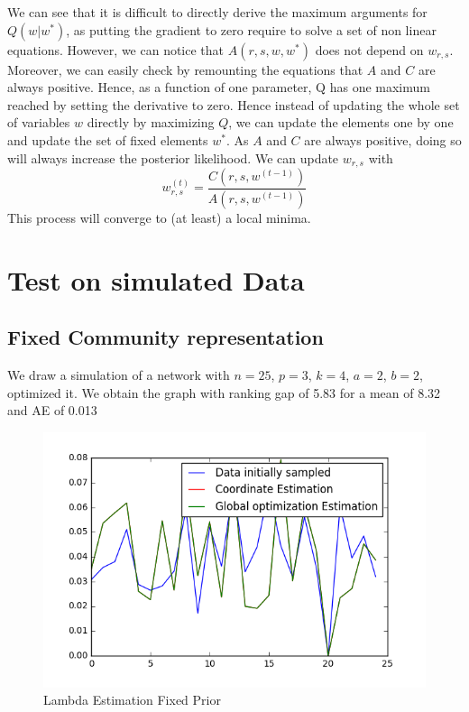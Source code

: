 \documentclass[12pt]{ociamthesis}  %
\begin{document}
	We can see that it is difficult to directly derive the maximum arguments for $Q(w|w^{*})$, as putting the gradient to zero require to solve a set of non linear equations. However, we can notice that $A(r,s,w,w^{*})$ does not depend on $w_{r,s}$. Moreover, we can easily check by remounting the equations that $A$ and $C$ are always positive. Hence, as a function of one parameter, Q has one maximum reached by setting the derivative to zero. Hence instead of updating the whole set of variables $w$ directly by maximizing $Q$, we can update the elements one by one and update the set of fixed elements $w^{*}$. As $A$ and $C$ are always positive, doing so will always increase the posterior likelihood. We can update $w_{r,s}$ with
	\begin{equation}
	w^{(t)}_{r,s} = \frac{C(r,s,w^{(t-1)})}{A(r,s,w^{(t-1)})}
	\end{equation}
	This process will converge to (at least) a local minima.
	
	\chapter{Test on simulated Data}
	
	\section{Fixed Community representation}
	
	We draw a simulation of a network with $n = 25$, $ p = 3$, $k = 4$, $a = 2$, $b = 2$, optimized it. We obtain the graph with ranking gap of 5.83 for a mean of 8.32 and AE of 0.013
		
	\begin{figure}
		\centering
		\includegraphics[width=\textwidth,height=\textheight,keepaspectratio]{LambdaEstimationFixedPrior}
		\caption{Lambda Estimation Fixed Prior}
		\label{label-image9}
	\end{figure}
	
\end{document}
